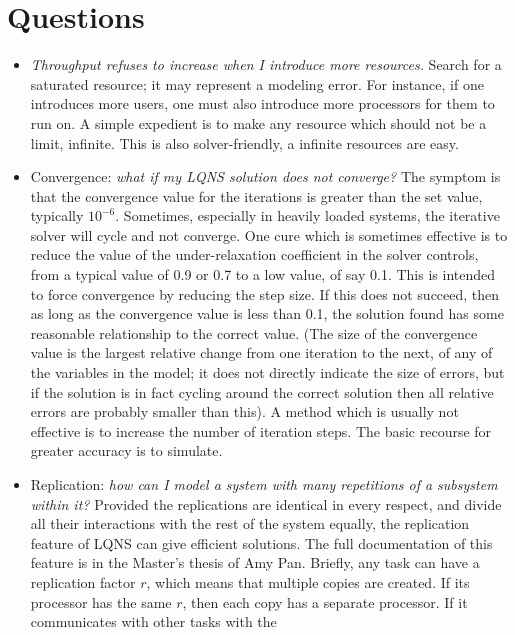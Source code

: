 \documentclass[11pt]{article}
\begin{document}
\section{Questions}
\label{sec:questions}
\begin{itemize}
\item \emph{Throughput refuses to increase when I introduce more
  resources.} Search for a saturated resource; it may represent a
  modeling error. For instance, if one introduces more users, one must
  also introduce more processors for them to run on. A simple
  expedient is to make any resource which should not be a limit,
  infinite. This is also solver-friendly, a infinite resources are
  easy. 
\item Convergence: \emph{what if my LQNS solution does not converge?} The
  symptom is that the convergence value for the iterations is greater
  than the set value, typically $10^{-6}$. Sometimes, especially in
  heavily loaded systems, the iterative solver will cycle and not
  converge. One cure which is sometimes effective is to reduce the
  value of the under-relaxation coefficient in the solver controls,
  from a typical value of 0.9 or 0.7 to a low value, of say 0.1. This
  is intended to force convergence by reducing the step size. If this
  does not succeed, then as long as the convergence value is less than
  0.1, the solution found has some reasonable relationship to the
  correct value. (The size of the convergence value is the largest
  relative change from one iteration to the next, of any of the
  variables in the model; it does not directly indicate the size of
  errors, but if the solution is in fact cycling around the correct
  solution then all relative errors are probably smaller than this). A
  method which is usually not effective is to increase the number of
  iteration steps. The basic recourse for greater accuracy is to
  simulate. 
\item Replication: \emph{how can I model a system with many repetitions of a
  subsystem within it?} Provided the replications are identical in
  every respect, and divide all their interactions with the rest of
  the system equally, the replication feature of LQNS can give
  efficient solutions. The full documentation of this feature is in
  the Master's thesis of Amy Pan. Briefly, any task can have a
  replication factor $r$, which means that multiple copies are
  created. If its processor has the same $r$, then each copy has a
  separate processor. If it communicates with other tasks with the

\end{itemize}
\end{document}
